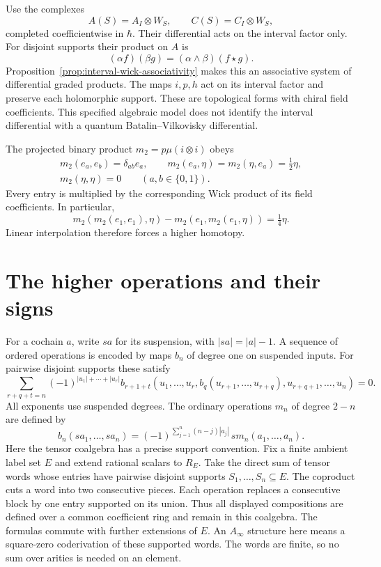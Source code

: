 Use the complexes
\[
 A(S)=A_I\otimes W_S,\qquad C(S)=C_I\otimes W_S,
\]
completed coefficientwise in $\hbar$.  Their differential acts on the
interval factor only.  For disjoint supports their product on $A$ is
\[
 (\alpha f)(\beta g)=(\alpha\wedge\beta)(f\star g).
\]
Proposition~\ref{prop:interval-wick-associativity} makes this an
associative system of differential graded products.  The maps $i,p,h$
act on its interval factor and preserve each holomorphic support.
These are topological forms with chiral field coefficients.  This
specified algebraic model does not identify the interval differential
with a quantum Batalin--Vilkovisky differential.

The projected binary product $m_2=p\mu(i\otimes i)$ obeys
\[
 \begin{gathered}
 m_2(e_a,e_b)=\delta_{ab}e_a,\qquad
 m_2(e_a,\eta)=m_2(\eta,e_a)=\tfrac12\eta,\\
 m_2(\eta,\eta)=0 \qquad (a,b\in\{0,1\}).
 \end{gathered}
\]
Every entry is multiplied by the corresponding Wick product of its
field coefficients.  In particular,
\[
 m_2(m_2(e_1,e_1),\eta)-m_2(e_1,m_2(e_1,\eta))
 =\tfrac14\eta.
\]
Linear interpolation therefore forces a higher homotopy.

\section{The higher operations and their signs}

For a cochain $a$, write $sa$ for its suspension, with
$|sa|=|a|-1$.  A sequence of ordered operations is encoded by
maps $b_n$ of degree one on suspended inputs.  For pairwise disjoint
supports these satisfy
\begin{equation*}
 \sum_{r+q+t=n}(-1)^{|u_1|+\cdots+|u_r|}
 b_{r+1+t}(u_1,\ldots,u_r,b_q(u_{r+1},\ldots,u_{r+q}),
                         u_{r+q+1},\ldots,u_n)=0.
\end{equation*}
All exponents use suspended degrees.  The ordinary operations $m_n$
of degree $2-n$ are defined by
\begin{equation*}
 b_n(sa_1,\ldots,sa_n)
 =(-1)^{\sum_{j=1}^n(n-j)|a_j|}\,s m_n(a_1,\ldots,a_n).
\end{equation*}
Here the tensor coalgebra has a precise support convention.  Fix a
finite ambient label set $E$ and extend rational scalars to $R_E$.
Take the direct sum of tensor words whose entries have pairwise disjoint
supports $S_1,\ldots,S_n\subseteq E$.  The coproduct cuts a word into
two consecutive pieces.  Each operation replaces a consecutive block by
one entry supported on its union.  Thus all displayed compositions are
defined over a common coefficient ring and remain in this coalgebra.
The formulas commute with further extensions of $E$.  An $A_\infty$
structure here means a square-zero coderivation of these supported words.
The words are finite, so no sum over arities is needed on an element.

